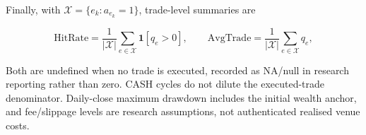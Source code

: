 Finally, with $\mathcal{X}=\{e_k:a_{e_k}=1\}$, trade-level summaries are

\begin{equation}
    \mathrm{HitRate}=\frac{1}{|\mathcal{X}|}
    \sum_{e\in\mathcal{X}}\mathbf{1}[q_e>0],\qquad
    \mathrm{AvgTrade}=\frac{1}{|\mathcal{X}|}
    \sum_{e\in\mathcal{X}}q_e,
    \label{eq:account_trade_metrics}
\end{equation}


Both are undefined when no trade is executed, recorded as NA/null in research reporting rather than zero. CASH cycles do not dilute the executed-trade denominator. Daily-close maximum drawdown includes the initial wealth anchor, and fee/slippage levels are research assumptions, not authenticated realised venue costs.
